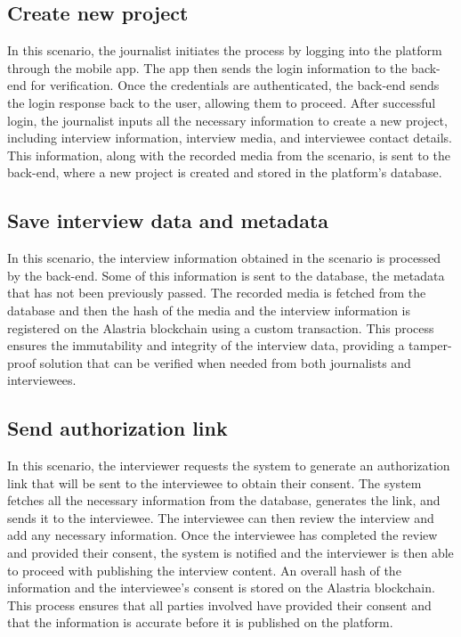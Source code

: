 \documentclass[target=mst,aauheader=]{thud}
\begin{document}
\subsection{Create new project}
\label{createNewProject}

In this scenario, the journalist initiates the process by logging into the platform through the mobile app. The app then sends the login information to the back-end for verification. Once the credentials are authenticated, the back-end sends the login response back to the user, allowing them to proceed. After successful login, the journalist inputs all the necessary information to create a new project, including interview information, interview media, and interviewee contact details. This information, along with the recorded media from the  scenario, is sent to the back-end, where a new project is created and stored in the platform's database.

\subsection{Save interview data and metadata}
\label{saveDataAndMetadata}

In this scenario, the interview information obtained in the  scenario is processed by the back-end. Some of this information is sent to the database, the metadata that has not been previously passed. The recorded media is fetched from the database and then the hash of the media and the interview information is registered on the Alastria blockchain using a custom transaction. This process ensures the immutability and integrity of the interview data, providing a tamper-proof solution that can be verified when needed from both journalists and interviewees.

\subsection{Send authorization link}
\label{generateAndSendLink}

In this scenario, the interviewer requests the system to generate an authorization link that will be sent to the interviewee to obtain their consent. The system fetches all the necessary information from the database, generates the link, and sends it to the interviewee. The interviewee can then review the interview and add any necessary information. Once the interviewee has completed the review and provided their consent, the system is notified and the interviewer is then able to proceed with publishing the interview content. An overall hash of the information and the interviewee's consent is stored on the Alastria blockchain. This process ensures that all parties involved have provided their consent and that the information is accurate before it is published on the platform.
\end{document}
